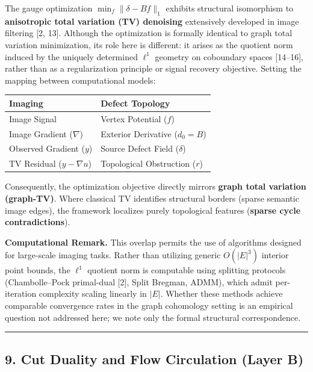 \documentclass[
]{article}
\begin{document}
The gauge optimization \(\min_f \|\delta - B f\|_1\) exhibits structural
isomorphism to \textbf{anisotropic total variation (TV) denoising}
extensively developed in image filtering {[}2, 13{]}. Although the
optimization is formally identical to graph total variation
minimization, its role here is different: it arises as the quotient norm
induced by the uniquely determined \(\ell^1\) geometry on coboundary
spaces {[}14--16{]}, rather than as a regularization principle or signal
recovery objective. Setting the mapping between computational models:

\begin{longtable}[]{@{}ll@{}}
\toprule\noalign{}
Imaging & Defect Topology \\
\midrule\noalign{}
\endhead
\bottomrule\noalign{}
\endlastfoot
Image Signal & Vertex Potential (\(f\)) \\
Image Gradient (\(\nabla\)) & Exterior Derivative (\(d_0 = B\)) \\
Observed Gradient (\(y\)) & Source Defect Field (\(\delta\)) \\
TV Residual (\(y - \nabla u\)) & Topological Obstruction (\(r\)) \\
\end{longtable}

Consequently, the optimization objective directly mirrors \textbf{graph
total variation (graph-TV)}. Where classical TV identifies structural
borders (sparse semantic image edges), the framework localizes purely
topological features (\textbf{sparse cycle contradictions}).

\textbf{Computational Remark.} This overlap permits the use of
algorithms designed for large-scale imaging tasks. Rather than utilizing
generic \(O(|E|^3)\) interior point bounds, the \(\ell^1\) quotient norm
is computable using splitting protocols (Chambolle--Pock primal-dual
{[}2{]}, Split Bregman, ADMM), which admit per-iteration complexity
scaling linearly in \(|E|\). Whether these methods achieve comparable
convergence rates in the graph cohomology setting is an empirical
question not addressed here; we note only the formal structural
correspondence.

\begin{center}\rule{0.5\linewidth}{0.5pt}\end{center}

\subsection{\texorpdfstring{9. Cut Duality and Flow Circulation
\textbf{(Layer
B)}}{9. Cut Duality and Flow Circulation (Layer B)}}\label{cut-duality-and-flow-circulation-layer-b}
\end{document}
